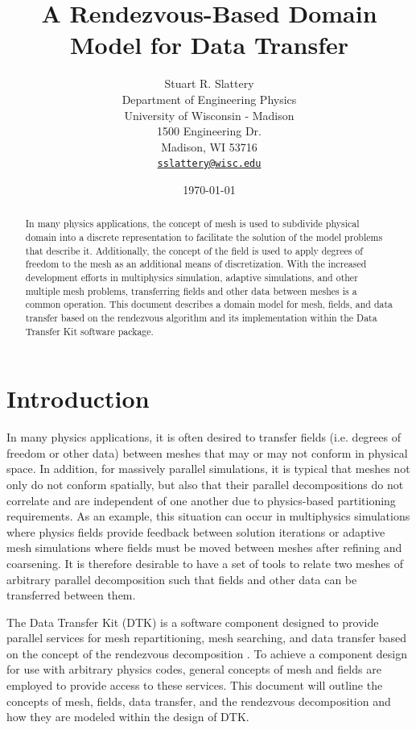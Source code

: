 \documentclass[letterpaper,12pt]{article}
\author{
  Stuart R. Slattery\\
  Department of Engineering Physics\\
  University of Wisconsin - Madison\\
  1500 Engineering Dr.\\
  Madison, WI 53716 \\
  \href{mailto:sslattery@wisc.edu}{\texttt{sslattery@wisc.edu}}
}
\date{\today}
\title{A Rendezvous-Based Domain Model for Data Transfer}
\begin{document}
\maketitle

\begin{abstract}
  In many physics applications, the concept of mesh is used to
  subdivide physical domain into a discrete representation to
  facilitate the solution of the model problems that describe
  it. Additionally, the concept of the field is used to apply degrees
  of freedom to the mesh as an additional means of
  discretization. With the increased development efforts in
  multiphysics simulation, adaptive simulations, and other multiple
  mesh problems, transferring fields and other data between meshes is
  a common operation. This document describes a domain model for mesh,
  fields, and data transfer based on the rendezvous algorithm and its
  implementation within the Data Transfer Kit software package.
\end{abstract}
\cleardoublepage
\tableofcontents
\clearpage
\listoffigures
\clearpage
\listoftables
\clearpage
\newpage

\section{Introduction}\label{sec:intro}
In many physics applications, it is often desired to transfer fields
(i.e. degrees of freedom or other data) between meshes that may or may
not conform in physical space. In addition, for massively parallel
simulations, it is typical that meshes not only do not conform
spatially, but also that their parallel decompositions do not
correlate and are independent of one another due to physics-based
partitioning requirements. As an example, this situation can occur in
multiphysics simulations where physics fields provide feedback between
solution iterations or adaptive mesh simulations where fields must be
moved between meshes after refining and coarsening. It is therefore
desirable to have a set of tools to relate two meshes of arbitrary
parallel decomposition such that fields and other data can be
transferred between them.

The Data Transfer Kit (DTK) is a software component designed to
provide parallel services for mesh repartitioning, mesh searching, and
data transfer based on the concept of the rendezvous decomposition
\cite{Plimpton_2004}. To achieve a component design for use with
arbitrary physics codes, general concepts of mesh and fields are
employed to provide access to these services. This document will
outline the concepts of mesh, fields, data transfer, and the
rendezvous decomposition and how they are modeled within the design of
DTK.
\end{document}
